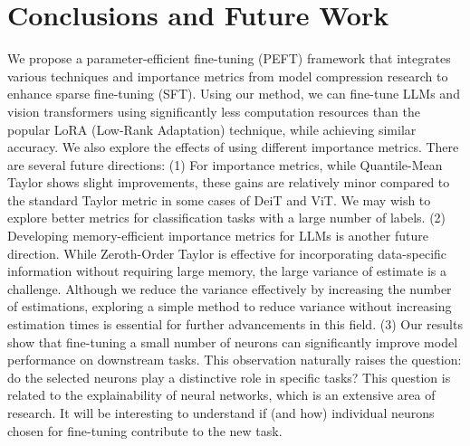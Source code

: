 \section{Conclusions and Future Work}\label{sec:conclude}

We propose a parameter-efficient fine-tuning (PEFT) framework that integrates various techniques and importance metrics from model compression research to enhance sparse fine-tuning (SFT). Using our method, we can fine-tune LLMs and vision transformers using significantly less computation resources than the popular LoRA (Low-Rank Adaptation) technique, while achieving similar accuracy. We also explore the effects of using different importance metrics. There are several future directions: (1) For importance metrics, while Quantile-Mean Taylor shows slight improvements, these gains are relatively minor compared to the standard Taylor metric in some cases of DeiT and ViT. We may wish to explore better metrics for classification tasks with a large number of labels. (2) Developing memory-efficient importance metrics for LLMs is another future direction. While Zeroth-Order Taylor is effective for incorporating data-specific information without requiring large memory, the large variance of estimate is a challenge. Although we reduce the variance effectively by increasing the number of estimations, exploring a simple method to reduce variance without increasing estimation times is essential for further advancements in this field. (3) Our results show that fine-tuning a small number of neurons can significantly improve model performance on downstream tasks. This observation naturally raises the question: do the selected neurons play a distinctive role in specific tasks? This question is related to the explainability of neural networks, which is an extensive area of research. It will be interesting to understand if (and how) individual neurons chosen for fine-tuning contribute to the new task. 